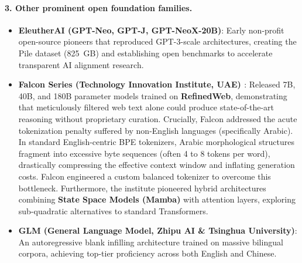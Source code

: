 \documentclass[../../main.tex]{subfiles}
\begin{document}
\paragraph{3. Other prominent open foundation families.}
\begin{itemize}
    \item \textbf{EleutherAI (GPT-Neo, GPT-J, GPT-NeoX-20B)}: Early non-profit open-source pioneers that reproduced GPT-3-scale architectures, creating the Pile dataset (825~GB) and establishing open benchmarks to accelerate transparent AI alignment research.
    \item \textbf{Falcon Series (Technology Innovation Institute, UAE) \cite{almazrouei2023falcon}}: Released 7B, 40B, and 180B parameter models trained on \textbf{RefinedWeb}, demonstrating that meticulously filtered web text alone could produce state-of-the-art reasoning without proprietary curation. Crucially, Falcon addressed the acute tokenization penalty suffered by non-English languages (specifically Arabic). In standard English-centric BPE tokenizers, Arabic morphological structures fragment into excessive byte sequences (often 4 to 8 tokens per word), drastically compressing the effective context window and inflating generation costs. Falcon engineered a custom balanced tokenizer to overcome this bottleneck. Furthermore, the institute pioneered hybrid architectures combining \textbf{State Space Models (Mamba)} with attention layers, exploring sub-quadratic alternatives to standard Transformers.
    \item \textbf{GLM (General Language Model, Zhipu AI \& Tsinghua University)}: An autoregressive blank infilling architecture trained on massive bilingual corpora, achieving top-tier proficiency across both English and Chinese.
\end{itemize}
\end{document}
